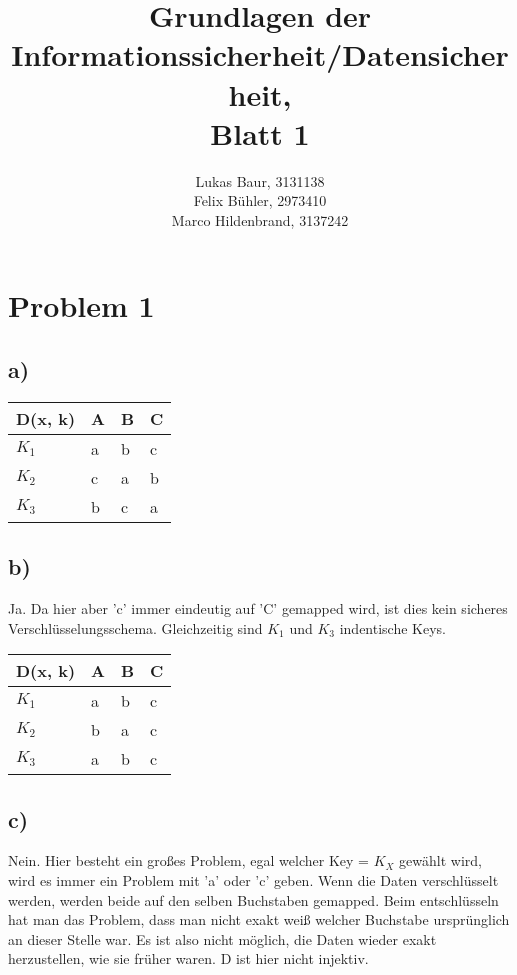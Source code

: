 \documentclass[12pt,pdftex,a4paper]{article}
\begin{document}
\title{ Grundlagen der Informationssicherheit/Datensicherheit,\\ Blatt 1}
\author{Lukas Baur, 3131138\\
		Felix Bühler, 2973410\\
		Marco Hildenbrand, 3137242}
\maketitle
\section*{Problem 1}
\subsection*{a)}
\begin{table}[!ht]
	\centering
	\begin{tabular}{|l|l|l|l|}
		\hline
		D(x, k) & A & B & C \\ \hline
		$ K_1 $ & a  & b  & c  \\ \hline
		$ K_2 $ & c  & a  & b  \\ \hline
		$ K_3 $ & b  & c  & a  \\ \hline
	\end{tabular}
\end{table}

\subsection*{b)}
Ja. Da hier aber 'c' immer eindeutig auf 'C' gemapped wird, ist dies kein sicheres Verschlüsselungsschema. Gleichzeitig sind $ K_1 $ und $ K_3 $ indentische Keys.
\begin{table}[!ht]
	\centering
	\begin{tabular}{|l|l|l|l|}
		\hline
		D(x, k) & A & B & C \\ \hline
		$ K_1 $ & a  & b  & c  \\ \hline
		$ K_2 $ & b  & a  & c  \\ \hline
		$ K_3 $ & a  & b  & c  \\ \hline
	\end{tabular}
\end{table}

\subsection*{c)}
Nein. Hier besteht ein großes Problem, egal welcher Key = $ K_X $ gewählt wird, wird es immer ein Problem mit 'a' oder 'c' geben. Wenn die Daten verschlüsselt werden, werden beide auf den selben Buchstaben gemapped. Beim entschlüsseln hat man das Problem, dass man nicht exakt weiß welcher Buchstabe ursprünglich an dieser Stelle war. Es ist also nicht möglich, die Daten wieder exakt herzustellen, wie sie früher waren. D ist hier nicht injektiv.
\end{document}
